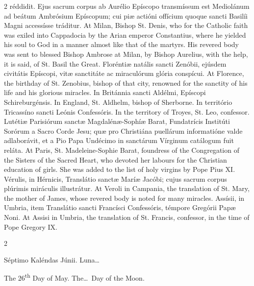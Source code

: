 \begin{paracol}{2}
 réddidit. Ejus sacrum corpus ab Aurélio Epíscopo transmíssum est 
 Mediolánum ad beátum Ambrósium Epíscopum; cui piæ actióni offícium quoque 
 sancti Basilíi Magni accessísse tráditur.
\switchcolumn
{}
At Milan, Bishop St. Denis, who for 
 the Catholic faith was exiled into Cappadocia by the Arian emperor 
 Constantius, where he yielded his soul to God in a manner almost like that 
 of the martyrs. His revered body was sent to blessed Bishop Ambrose at 
 Milan, by Bishop Aurelius, with the help, it is said, of St. Basil the 
 Great.
\switchcolumn*
{}
Floréntiæ natális 
 sancti Zenóbii, ejúsdem civitátis Epíscopi, vitæ sanctitáte ac miraculórum 
 glória conspícui.
\switchcolumn
{}
At Florence, the birthday of St. 
 Zenobius, bishop of that city, renowned for the sanctity of his life and his 
 glorious miracles.
\switchcolumn*
{}
In Británnia sancti 
 Aldélmi, Epíscopi Schireburgénsis.
\switchcolumn
{}
In England, St. Aldhelm, bishop of 
 Sherborne.
\switchcolumn*
{}
In território 
 Tricassíno sancti Leónis Confessóris.
\switchcolumn
{}
In the territory of Troyes, St. 
 Leo, confessor.
\switchcolumn*
{}
Lutétiæ Parisiórum 
 sanctæ Magdalénæ-Sophíæ Barat, Fundatrícis Institúti Sorórum a Sacro Corde 
 Jesu; quæ pro Christiána puellárum informatióne valde adlaborávit, et a Pio 
 Papa Undécimo in sanctárum Vírginum catálogum fuit reláta.
\switchcolumn
{}
At Paris, St. Madeleine-Sophie 
 Barat, foundress of the Congregation of the Sisters of the Sacred Heart, who 
 devoted her labours for the Christian education of girls. She was 
 added to the list of holy virgins by Pope Pius XI.
\switchcolumn*
{}
Vérulis, in Hérnicis, 
 Translátio sanctæ Maríæ Jacóbi; cujus sacrum corpus 
 plúrimis miráculis 
 illustrátur.
\switchcolumn
{}
At Veroli in Campania, the 
 translation of St. Mary, the mother of James, whose revered body is noted 
 for many miracles.
\switchcolumn*
{}
Assísii, in Umbria, 
 item Translátio sancti Francísci Confessóris, témpore Gregórii Papæ Noni.
\switchcolumn
{}
At Assisi in Umbria, the 
 translation of St. Francis, confessor, in the time of Pope Gregory IX.
\switchcolumn*
{}
\end{paracol}


\begin{paracol}{2}
\begin{center}{\color{gregoriocolor} Séptimo Kaléndas Júnii. 
 Luna\dots\ }\end{center}
\switchcolumn
{}
\begin{center}{\color{gregoriocolor} The 
 26\textsuperscript{th} Day of May. The\dots\ Day of the Moon.}\end{center}
\end{paracol}

